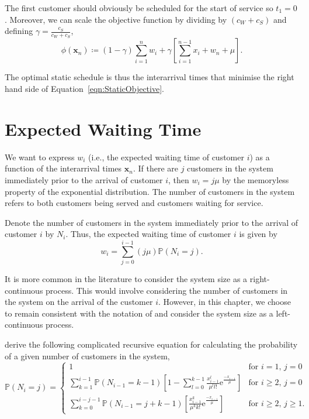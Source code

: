 The first customer should obviously be scheduled for the start of service so $t_{1} = 0$. Moreover, we can scale the objective function by dividing by $(c_{W} + c_{S})$ and defining $\gamma = \frac{c_{S}}{c_{W} + c_{S}}$,
\begin{equation}
	\phi (\mathbf{x}_{n}) \coloneqq (1 - \gamma) \sum_{i = 1}^{n} w_{i} + \gamma \left[ \sum_{i = 1}^{n - 1} x_{i} + w_{n} + \mu \right].
	\label{eqn:StaticObjective}
\end{equation}

The optimal static schedule is thus the interarrival times that minimise the right hand side of Equation~\ref{eqn:StaticObjective}.

\section{Expected Waiting Time}
We want to express $w_{i}$ (i.e., the expected waiting time of customer $i$) as a function of the interarrival times $\mathbf{x}_{n}$. If there are $j$ customers in the system immediately prior to the arrival of customer $i$, then $w_{i} = j \mu$ by the memoryless property of the exponential distribution. The number of customers in the system refers to both customers being served and customers waiting for service.

Denote the number of customers in the system immediately prior to the arrival of customer $i$ by $N_{i}$. Thus, the expected waiting time of customer $i$ is given by
\begin{equation}
	w_{i} = \sum_{j = 0}^{i - 1} (j \mu) \mathbb{P} (N_{i} = j).
\end{equation}

It is more common in the literature to consider the system size as a right-continuous process. This would involve considering the number of customers in the system on the arrival of the customer $i$. However, in this chapter, we choose to remain consistent with the notation of \citet{Pegden} and consider the system size as a left-continuous process.

\citet{Pegden} derive the following complicated recursive equation for calculating the probability of a given number of customers in the system,
\begin{equation}
	\mathbb{P} (N_{i} = j) = \begin{cases} 1 & \text{for $i = 1$, $j = 0$} \\
	\sum_{k = 1}^{i - 1} \mathbb{P} (N_{i - 1} = k - 1) \left[ 1 - \sum_{l = 0}^{k - 1} \frac{x_{i - 1}^{l}}{\mu^{l} l!} \mathrm{e}^{\frac{- x_{i - 1}}{\mu}}\right] & \text{for $i \geq 2$, $j = 0$} \\
	\sum_{k = 0}^{i - j - 1} \mathbb{P} (N_{i - 1} = j + k - 1) \left[ \frac{x_{i - 1}^{k}}{\mu^{k} k!} \mathrm{e}^{\frac{- x_{i - 1}}{\mu}} \right] & \text{for $i \geq 2$, $j \geq 1$}. \end{cases}
	\label{eqn:StaticProbSystem}
\end{equation}

